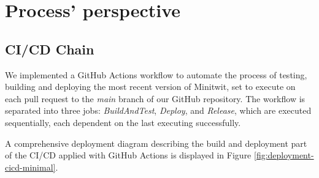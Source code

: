 \documentclass[12pt, a4paper, oneside]{book}
\begin{document}
\chapter{Process' perspective}

\section{CI/CD Chain}
We implemented a GitHub Actions workflow to automate the process of testing, building and deploying the most recent version of Minitwit, set to execute on each pull request to the \textit{main} branch of our GitHub repository.
The workflow is separated into three jobs: \textit{BuildAndTest}, \textit{Deploy}, and \textit{Release}, which are executed sequentially, each dependent on the last executing successfully. \bigskip

A comprehensive deployment diagram describing the build and deployment part of the CI/CD applied with GitHub Actions is displayed in Figure \ref{fig:deployment-cicd-minimal}.\bigskip
\end{document}
